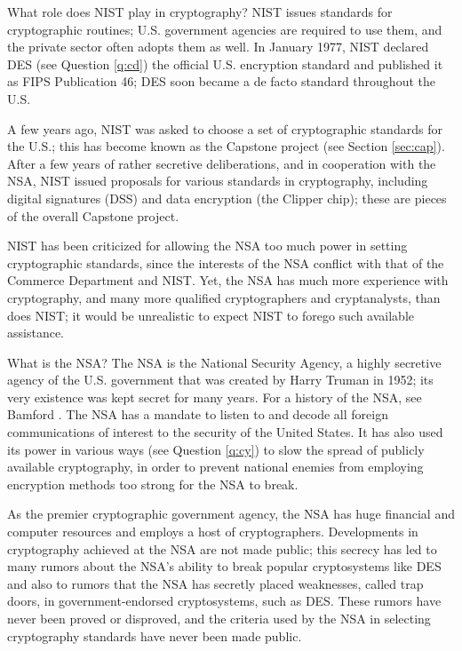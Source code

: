 {What role does NIST play in cryptography?}
NIST issues standards for cryptographic routines; U.S. government agencies
are required to use them, and the private sector often adopts them as well.
In January 1977, NIST declared DES (see Question \ref{q:cd}) the official 
U.S. encryption standard and published it as FIPS Publication 46; DES soon 
became a de facto standard throughout the U.S.

A few years ago, NIST was asked to choose a set of cryptographic standards
for the U.S.; this has become known as the Capstone project (see Section 
\ref{sec:cap}). After a few years of rather secretive deliberations, and
in cooperation with the NSA, NIST issued proposals for various standards 
in cryptography, including digital signatures (DSS) and data encryption 
(the Clipper chip); these are pieces of the overall Capstone project.

NIST has been criticized for allowing the NSA too much power in setting 
cryptographic standards, since the interests of the NSA conflict with that 
of the Commerce Department and NIST. Yet, the NSA has much more experience
with cryptography, and many more qualified cryptographers and cryptanalysts,
than does NIST; it would be unrealistic to expect NIST to forego such 
available assistance.

{What is the NSA?}
The NSA is the National Security Agency, a highly secretive agency of the 
U.S. government that was created by Harry Truman in 1952; its very existence 
was kept secret for many years. For a history of the NSA, see Bamford \cite
{bamford}. The NSA has a mandate to listen to and decode all foreign 
communications of interest to the security of the United States. It has also 
used its power in various ways (see Question \ref{q:cy}) to slow the spread 
of publicly available cryptography, in order to prevent national enemies 
from employing encryption methods too strong for the NSA to break.

As the premier cryptographic government agency, the NSA has huge financial 
and computer resources and employs a host of cryptographers. Developments in 
cryptography achieved at the NSA are not made public; this secrecy has led to 
many rumors about the NSA's ability to break popular cryptosystems like DES 
and also to rumors that the NSA has secretly placed weaknesses, called trap 
doors, in government-endorsed cryptosystems, such as DES. These rumors have 
never been proved or disproved, and the criteria used by the NSA in selecting 
cryptography standards have never been made public. 

